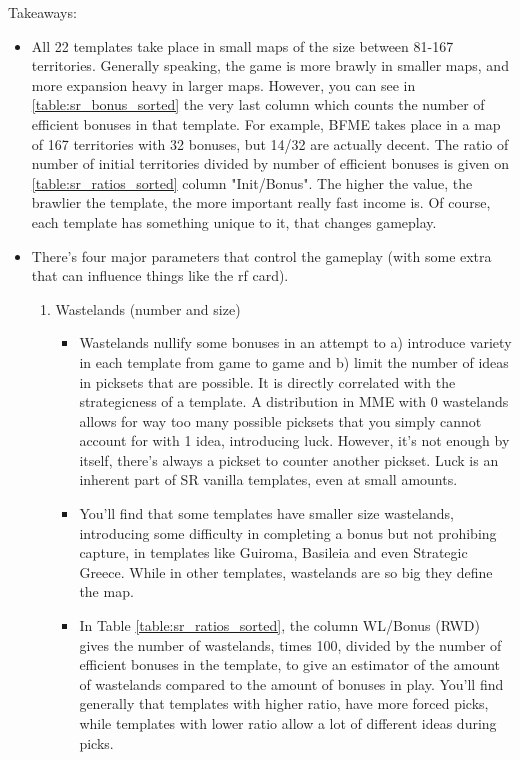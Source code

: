 Takeaways:
\begin{itemize}
    \item All 22 templates take place in small maps of the size between 81-167 territories. Generally speaking, the game is more brawly in smaller maps, and more expansion heavy in larger maps. However, you can see in \ref{table:sr_bonus_sorted} the very last column which counts the number of efficient bonuses in that template. For example, BFME takes place in a map of 167 territories with 32 bonuses, but 14/32 are actually decent. The ratio of number of initial territories divided by number of efficient bonuses is given on \ref{table:sr_ratios_sorted} column "Init/Bonus". The higher the value, the brawlier the template, the more important really fast income is. Of course, each template has something unique to it, that changes gameplay.
    \item There's four major parameters that control the gameplay (with some extra that can influence things like the rf card).
    \begin{enumerate}
        \item Wastelands (number and size)
        \begin{itemize}
            \item Wastelands nullify some bonuses in an attempt to a) introduce variety in each template from game to game and b) limit the number of ideas in picksets that are possible. It is directly correlated with the strategicness of a template. A distribution in MME with 0 wastelands allows for way too many possible picksets that you simply cannot account for with 1 idea, introducing luck. However, it's not enough by itself, there's always a pickset to counter another pickset. Luck is an inherent part of SR vanilla templates, even at small amounts.
            \item You'll find that some templates have smaller size wastelands, introducing some difficulty in completing a bonus but not prohibing capture, in templates like Guiroma, Basileia and even Strategic Greece. While in other templates, wastelands are so big they define the map.
            \item In Table \ref{table:sr_ratios_sorted}, the column WL/Bonus (RWD) gives the number of wastelands, times 100, divided by the number of efficient bonuses in the template, to give an estimator of the amount of wastelands compared to the amount of bonuses in play. You'll find generally that templates with higher ratio, have more forced picks, while templates with lower ratio allow a lot of different ideas during picks. 

\end{itemize}
\end{enumerate}
\end{itemize}
